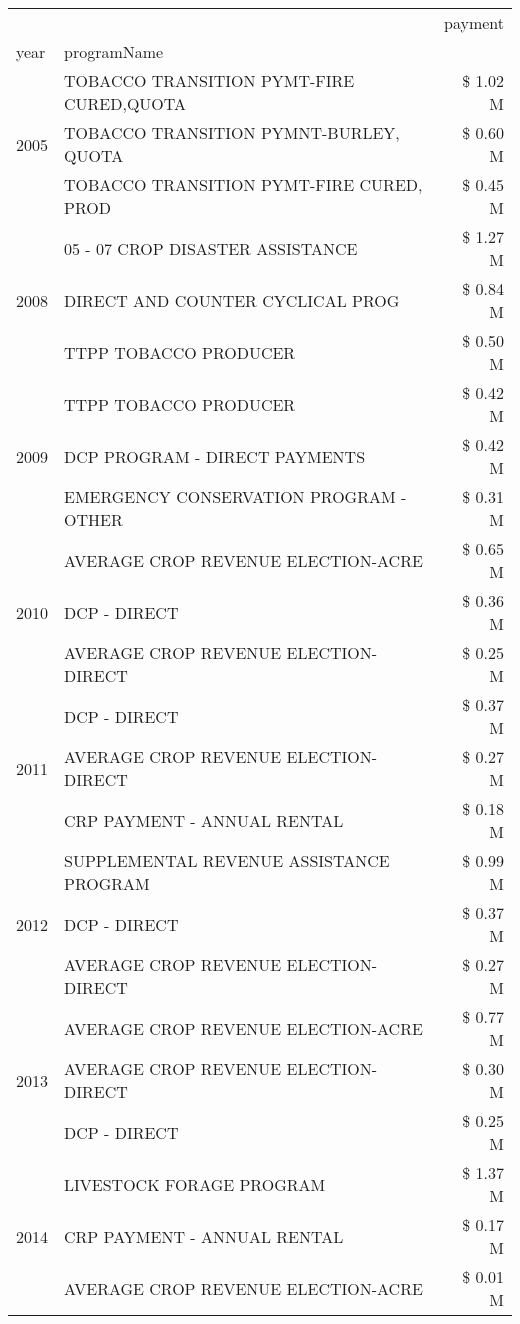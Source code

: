 \begin{tabular}{llr}
\toprule
 &  & payment \\
year & programName &  \\
\midrule
\multirow[t]{3}{*}{2005} & TOBACCO TRANSITION PYMT-FIRE CURED,QUOTA & \$ 1.02 M \\
 & TOBACCO TRANSITION PYMNT-BURLEY, QUOTA & \$ 0.60 M \\
 & TOBACCO TRANSITION PYMT-FIRE CURED, PROD & \$ 0.45 M \\
\cline{1-3}
\multirow[t]{3}{*}{2008} & 05 - 07 CROP DISASTER ASSISTANCE & \$ 1.27 M \\
 & DIRECT AND COUNTER CYCLICAL PROG & \$ 0.84 M \\
 & TTPP TOBACCO PRODUCER & \$ 0.50 M \\
\cline{1-3}
\multirow[t]{3}{*}{2009} & TTPP TOBACCO PRODUCER & \$ 0.42 M \\
 & DCP PROGRAM - DIRECT PAYMENTS & \$ 0.42 M \\
 & EMERGENCY CONSERVATION PROGRAM - OTHER & \$ 0.31 M \\
\cline{1-3}
\multirow[t]{3}{*}{2010} & AVERAGE CROP REVENUE ELECTION-ACRE & \$ 0.65 M \\
 & DCP - DIRECT & \$ 0.36 M \\
 & AVERAGE CROP REVENUE ELECTION-DIRECT & \$ 0.25 M \\
\cline{1-3}
\multirow[t]{3}{*}{2011} & DCP - DIRECT & \$ 0.37 M \\
 & AVERAGE CROP REVENUE ELECTION-DIRECT & \$ 0.27 M \\
 & CRP PAYMENT - ANNUAL RENTAL & \$ 0.18 M \\
\cline{1-3}
\multirow[t]{3}{*}{2012} & SUPPLEMENTAL REVENUE ASSISTANCE PROGRAM & \$ 0.99 M \\
 & DCP - DIRECT & \$ 0.37 M \\
 & AVERAGE CROP REVENUE ELECTION-DIRECT & \$ 0.27 M \\
\cline{1-3}
\multirow[t]{3}{*}{2013} & AVERAGE CROP REVENUE ELECTION-ACRE & \$ 0.77 M \\
 & AVERAGE CROP REVENUE ELECTION-DIRECT & \$ 0.30 M \\
 & DCP - DIRECT & \$ 0.25 M \\
\cline{1-3}
\multirow[t]{3}{*}{2014} & LIVESTOCK FORAGE PROGRAM & \$ 1.37 M \\
 & CRP PAYMENT - ANNUAL RENTAL & \$ 0.17 M \\
 & AVERAGE CROP REVENUE ELECTION-ACRE & \$ 0.01 M \\
\cline{1-3}

\end{tabular}
